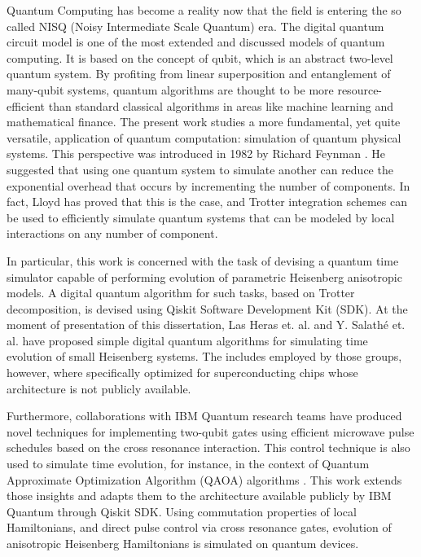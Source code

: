 Quantum Computing has become a reality now that the field is entering the so called NISQ (Noisy Intermediate Scale Quantum) era. The digital quantum circuit model is one of the most extended and discussed models of quantum computing. It is based on the concept of qubit, which is an abstract two-level quantum system. By profiting from linear superposition and entanglement of many-qubit systems, quantum algorithms are thought to be more resource-efficient than standard classical algorithms in areas like machine learning and mathematical finance. The present work studies a more fundamental, yet quite versatile, application of quantum computation: simulation of quantum physical systems. This perspective was introduced in 1982 by Richard Feynman \cite{Feynman1982}. He suggested that using one quantum system to simulate another can reduce the exponential overhead that occurs by incrementing the number of components. In fact, Lloyd \cite{LloydNature} has proved that this is the case, and Trotter integration schemes can be used to efficiently simulate quantum systems that can be modeled by local interactions on any number of component.

In particular, this work is concerned with the task of devising a quantum time simulator capable of performing evolution of parametric Heisenberg anisotropic models. A digital quantum algorithm for such tasks, based on Trotter decomposition, is devised using Qiskit Software Development Kit (SDK). At the moment of presentation of this dissertation, Las Heras et. al. \cite{HubbardSimulLasHeras, HubbardSimul} and Y. Salathé et. al. \cite{HeisenbergSimulLasHeras} have proposed simple digital quantum algorithms for simulating time evolution of small Heisenberg systems. The includes employed by those groups, however, where specifically optimized for superconducting chips whose architecture is not publicly available.

Furthermore, collaborations with IBM Quantum research teams \cite{DuplicatedRXZPulse, RXZPulseEfficient, MajoranaSimulation} have produced novel techniques for implementing two-qubit gates using efficient microwave pulse schedules based on the cross resonance interaction. This control technique is also used to simulate time evolution, for instance, in the context of Quantum Approximate Optimization Algorithm (QAOA) algorithms \cite{RXZPulseEfficient}. This work extends those insights and adapts them to the architecture available publicly by IBM Quantum through Qiskit SDK. Using commutation properties of local Hamiltonians, and direct pulse control via cross resonance gates, evolution of anisotropic Heisenberg Hamiltonians is simulated on quantum devices.

